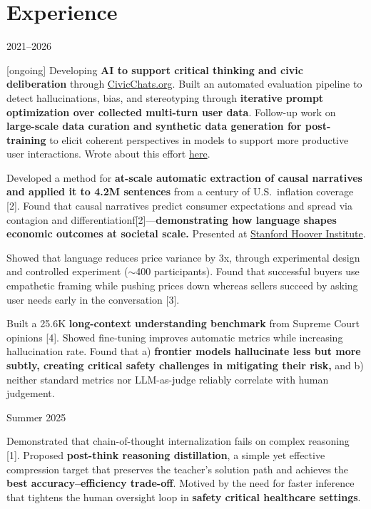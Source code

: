 \documentclass[11pt,letterpaper]{article}
\begin{document}
\section*{Experience}
\vspace{4pt}
 \hfill 2021--2026
\begin{cvitems}
    \item {[ongoing]} Developing \textbf{AI to support critical thinking and civic deliberation} through \href{https://civicchats.org}{CivicChats.org}. Built an automated evaluation pipeline to detect hallucinations, bias, and stereotyping through \textbf{iterative prompt optimization over collected multi-turn user data}. Follow-up work on \textbf{large-scale data curation and synthetic data generation for post-training} to elicit coherent perspectives in models to support more productive user interactions. Wrote about this effort \href{https://open.substack.com/pub/cichicago/p/civicchats-building-ai-to-support}{here}.
    \item Developed a method for \textbf{at-scale automatic extraction of causal narratives and applied it to 4.2M sentences} from a century of U.S.\ inflation coverage [2]. Found that causal narratives predict consumer expectations and spread via contagion and differentiationf[2]---\textbf{demonstrating how language shapes economic outcomes at societal scale.} Presented at \href{https://www.hoover.org}{Stanford Hoover Institute}.
    \item Showed that language reduces price variance by 3x, through experimental design and controlled experiment ($\sim$400 participants). Found that successful buyers use empathetic framing while pushing prices down whereas sellers succeed by asking user needs early in the conversation [3].
    \item Built a 25.6K \textbf{long-context understanding benchmark} from Supreme Court opinions [4]. Showed fine-tuning improves automatic metrics while increasing hallucination rate. Found that a) \textbf{frontier models hallucinate less but more subtly, creating critical safety challenges in mitigating their risk,} and b) neither standard metrics nor LLM-as-judge reliably correlate with human judgement.
\end{cvitems}

\vspace{4pt}
 \hfill Summer 2025
\begin{cvitems}
    \item Demonstrated that chain-of-thought internalization fails on complex reasoning [1]. Proposed \textbf{post-think reasoning distillation}, a simple yet effective compression target that preserves the teacher's solution path and achieves the \textbf{best accuracy--efficiency trade-off}. Motived by the need for faster inference that tightens the human oversight loop in \textbf{safety critical healthcare settings}.
\end{cvitems}
\end{document}
